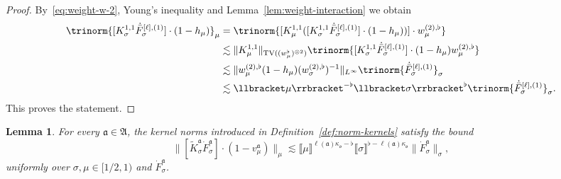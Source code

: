 \documentclass{article}
\numberwithin{equation}{section}
\theoremstyle{plain}
\newtheorem{lemma}[theorem]{Lemma}
\theoremstyle{definition}
\begin{document}
\begin{proof}
  By~\eqref{eq:weight-w-2}, Young's inequality and
  Lemma~\ref{lem:weight-interaction} we obtain
  \[ \begin{aligned}
       \trinorm{ [K^{1, 1}_{\sigma} \dot{\bar{F}}_{\sigma}^{[\ell], (1)}]
       \cdot (1 - h_{\mu}) }_{\mu} & =  \trinorm{ [K^{1, 1}_{\mu}
       ([K^{1, 1}_{\sigma} \dot{\bar{F}}_{\sigma}^{[\ell], (1)}] \cdot (1 -
       h_{\mu}))] \cdot w_{\mu}^{(2), \flat} }\\
       & \lesssim  \| K^{1, 1}_{\mu} \|_{\operatorname{TV}
       ((w_{\mu}^{\flat})^{\otimes 2})}  \trinorm{ [K^{1, 1}_{\sigma}
       \dot{\bar{F}}_{\sigma}^{[\ell], (1)}] \cdot (1 - h_{\mu}) w_{\mu}^{(2),
       \flat} }\\
       & \lesssim  \| w_{\mu}^{(2), \flat} (1 - h_{\mu})  (w_{\sigma}^{(2),
       \flat})^{- 1} \|_{L^{\infty}}  \trinorm{
       \dot{\bar{F}}_{\sigma}^{[\ell], (1)} }_{\sigma}\\
       & \lesssim  \llbracket \mu \rrbracket^{- \flat} \llbracket \sigma
       \rrbracket^{\flat} \trinorm{ \dot{\bar{F}}_{\sigma}^{[\ell], (1)}
       }_{\sigma} .
     \end{aligned} \]
  This proves the statement.
\end{proof}


\begin{lemma}
  \label{lem:estimates-1-v} For every \(\mathfrak a\in\mathfrak A\), the kernel norms introduced in
  Definition~\ref{def:norm-kernels} satisfy the bound
  \[ \| [\tilde{K}^{\mathfrak{a}}_{\sigma} \dot{F}^{\mathfrak{a}}_{\sigma}]
     \cdot (1 - v^{\mathfrak{a}}_{\mu}) \|_{\mu} \lesssim \llbracket \mu
     \rrbracket^{\ell (\mathfrak{a}) \kappa_{\mathfrak{o}} - \flat} \llbracket
     \sigma \rrbracket^{\flat - \ell (\mathfrak{a}) \kappa_{\mathfrak{o}}}  \|
     \dot{F}^{\mathfrak{a}}_{\sigma} \|_{\sigma}, \]
  uniformly over $\sigma, \mu \in [1 / 2, 1)$ and
  $\dot{F}^{\mathfrak{a}}_{\sigma}$.
\end{lemma}
\end{document}
